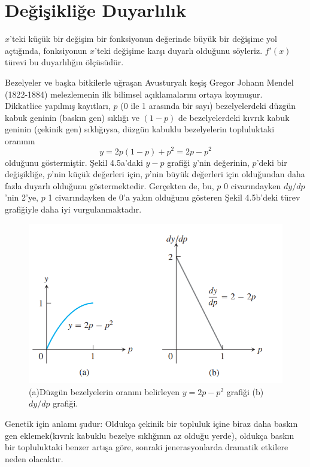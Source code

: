 \section{\protect Değişikliğe Duyarlılık} \label{bolumetiketi}
$x$'teki küçük bir değişim bir fonksiyonun değerinde büyük bir değişime yol açtığında, fonksiyonun $x$'teki değişime karşı duyarlı olduğunu söyleriz. $f'(x)$ türevi bu duyarlılığın ölçüsüdür.
\begin{ornek}
Bezelyeler ve başka bitkilerle uğraşan Avusturyalı keşiş Gregor Johann Mendel (1822-1884) melezlemenin ilk bilimsel açıklamalarını ortaya koymuşur.\\
Dikkatlice yapılmış kayıtları, $p$ (0 ile 1 arasında bir sayı) bezelyelerdeki düzgün kabuk geninin (baskın gen) sıklığı ve $(1-p)$ de bezelyelerdeki kıvrık kabuk geninin (çekinik gen) sıklığıysa, düzgün kabuklu bezelyelerin topluluktaki oranının
	\begin{equation*}
	y=2p(1-p)+p^2=2p-p^2
	\end{equation*}
olduğunu göstermiştir. Şekil 4.5a'daki $y-p$ grafiği $y$'nin değerinin, $p$'deki bir değişikliğe, $p$'nin küçük değerleri için, $p$'nin büyük değerleri için olduğundan daha fazla duyarlı olduğunu göstermektedir. Gerçekten de, bu, $p$ 0 civarındayken $dy/dp$'nin 2'ye, $p$ 1 civarındayken de 0'a yakın olduğunu gösteren Şekil 4.5b'deki türev grafiğiyle daha iyi vurgulanmaktadır.
\begin{figure}[H]
	\centering
	\includegraphics[width=0.7\linewidth]{mendelres.png}
	\caption{(a)Düzgün bezelyelerin oranını belirleyen $y=2p-p^2$ grafiği (b) $dy/dp$ grafiği.}
	\label{fig:ornekresim}
\end{figure}
Genetik için anlamı şudur: Oldukça çekinik bir topluluk içine biraz daha baskın gen eklemek(kıvrık kabuklu bezelye sıklığının az olduğu yerde), oldukça baskın bir topluluktaki benzer artışa göre, sonraki jenerasyonlarda dramatik etkilere neden olacaktır.
\end{ornek}

